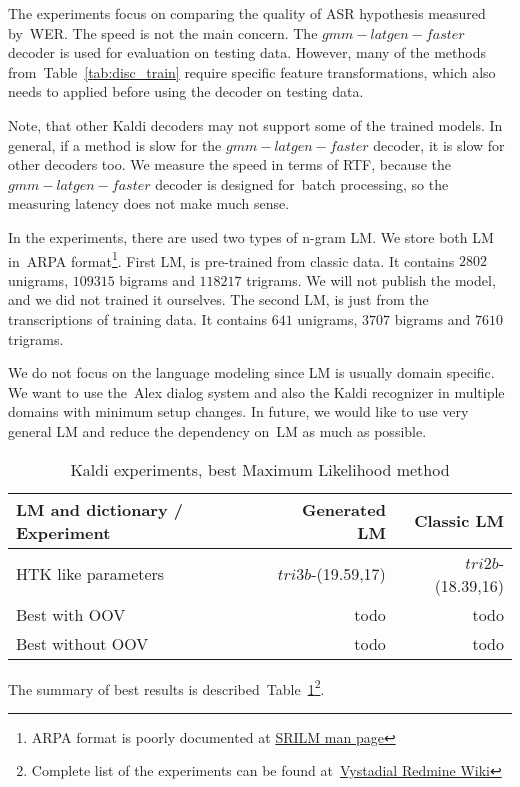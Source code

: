 The experiments focus on comparing the quality of ASR hypothesis measured by~\ac{WER}.
The speed is not the main concern.  The $gmm-latgen-faster$ decoder is used for evaluation on testing data. 
However, many of the methods from~Table~\ref{tab:disc_train}
require specific feature transformations, which also needs to applied before using the decoder on testing data.

Note, that other Kaldi decoders may not support some of the trained models.
In general, if a method is slow for the $gmm-latgen-faster$ decoder, it is slow for other decoders too.
We measure the speed in terms of \ac{RTF}, because the $gmm-latgen-faster$ decoder is designed for~batch 
processing, so the measuring latency does not make much sense.

In the experiments, there are used two types of n-gram \acl{LM}. 
We store both \ac{LM} in~ARPA format\footnote{ARPA format is poorly documented at 
\href{http://www.speech.sri.com/projects/srilm/manpages/ngram-format.5.html}{SRILM man page}}.
First \ac{LM}, is pre-trained from classic data. It contains $2802$ unigrams, $109315$ bigrams and
$118217$ trigrams. We will not publish the model, and we did not trained it ourselves. 
The second \ac{LM}, is just from the transcriptions of training data. It contains 
$641$ unigrams, $3707$ bigrams and $7610$ trigrams.

We do not focus on the language modeling since \ac{LM} is usually domain specific.
We want to use the~Alex dialog system and also the Kaldi recognizer in multiple domains with minimum
setup changes. In future, we would like to use very general \ac{LM} and reduce the dependency on~\ac{LM}
as much as possible.

\begin{table}[!htp]\label{tab:exp_best}
\begin{tabular}{lrr}
\hline
\parbox[t]{6.0cm}{\ac{LM} and dictionary / Experiment} & Generated \acs{LM}  & Classic \ac{LM} \\
\hline
\ac{HTK} like parameters    &  $tri3b$-(19.59,17) & $tri2b$-(18.39,16) \\
Best with OOV               & todo & todo \\
Best without OOV            & todo & todo \\
\hline
\end{tabular}
\caption{Kaldi experiments, best Maximum Likelihood method}
\end{table}

The summary of best results is described~Table~\ref{tab:exp_best}\footnote{ 
Complete list of the experiments can be found 
at~\href{https://redmine.ms.mff.cuni.cz/projects/Vystadial/wiki/Acoustic_models/}{Vystadial Redmine Wiki}}. 

